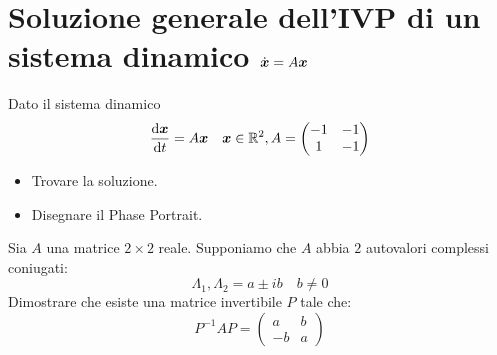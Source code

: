 \section{Soluzione generale dell’IVP di un sistema dinamico $\dot{\boldsymbol{x}}= A\boldsymbol{x}$ }%
\begin{ex}
    Dato il sistema dinamico 
    \[
	\frac{\text{d} \boldsymbol{x}}{\text{d} t} = A\boldsymbol{x}  \quad \boldsymbol{x}\in \mathbb{R}^2, A = \begin{pmatrix} -1 & -1 \\ 1 & - 1 \end{pmatrix} 
    \] 
    \begin{itemize}
        \item Trovare la soluzione.
	\item Disegnare il Phase Portrait.
    \end{itemize}
\end{ex}
\noindent
\begin{ex}
    Sia $A$ una matrice $2\times 2$ reale. Supponiamo che $A$ abbia $2$ autovalori complessi coniugati: 
    \[
        \Lambda_1, \Lambda_2 = a \pm ib \quad b\neq 0
    \] 
    Dimostrare che esiste una matrice invertibile $P$ tale che:
    \[
	P^{-1}AP = \begin{pmatrix} a & b \\ -b & a \end{pmatrix} 
    \] 
\end{ex}
\noindent
